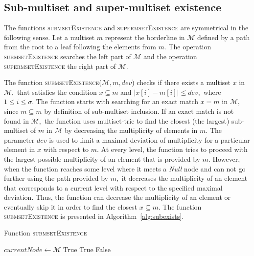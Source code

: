\subsection{Sub-multiset and super-multiset existence}
\label{s:subexists} \label{s:superexists}
The functions \textsc{submsetExistence} and \textsc{supermsetExistence} are
symmetrical in the following sense. Let a multiset $m$ represent the borderline
in $\mathcal{M}$ defined by a path from the root to a leaf following
the elements from $m$. The operation \textsc{submsetExistence} searches
the left part of $\mathcal{M}$ and the operation \textsc{supermsetExistence}
the right part of $\mathcal{M}$. 

The function \textsc{submsetExistence}($\mathcal{M},m,dev$) checks if there exists 
a multiset $x$ in $\mathcal{M},$ that satisfies the condition $x\subseteq m$ and 
$| x[i] - m[i] | \leq dev,$ where $1\leq i \leq \sigma.$ 
The function starts with searching for an exact match $x=m$ in $\mathcal{M},$ 
since $m\subseteq m$ by definition of sub-multiset inclusion. If an exact match is 
not found in $\mathcal{M},$ the function uses multiset-trie to find the closest 
(the largest) sub-multiset of $m$ in $\mathcal{M}$ by decreasing the multiplicity of 
elements in $m.$ The parameter $dev$ is used to limit a maximal deviation of 
multiplicity for a particular element in $x$ with respect to $m.$ 
At every level, the function tries to proceed with the largest possible multiplicity of 
an element that is provided by $m.$ However, when the function reaches some level 
where it meets a \emph{Null} node and can not go further using the path provided by 
$m,$ it decreases the multiplicity of an element 
that corresponds to a current level with respect to the specified maximal deviation. 
Thus, the function can decrease the multiplicity of an element or eventually skip it in 
order to find the closest $x\subseteq m.$ The function \textsc{submsetExistence} 
is presented in Algorithm~\ref{alg:subexists}.

\begin{algorithm}[h!]
\caption{Function \textsc{submsetExistence}}
\label{alg:subexists}
\begin{algorithmic}[1]
\State $currentNode \gets \mathcal{M}$
\State \Return True
\EndIf
{}
\State \Return True
\EndIf
\EndIf
\EndFor
\State \Return False
\EndFunction
\end{algorithmic}
\end{algorithm}

